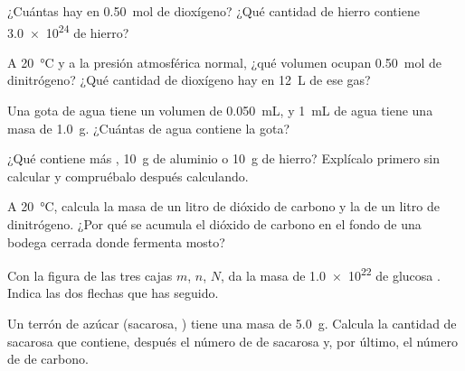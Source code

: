 \begin{exercise}[$\star$]\label{exo:g10:the-mole:4}
¿Cuántas  hay en \qty{0.50}{mol} de dioxígeno? ¿Qué cantidad
de hierro contiene \num{3.0e24}  de hierro?
\end{exercise}

\begin{exercise}[$\star$]\label{exo:g10:the-mole:5}
A \qty{20}{\celsius} y a la presión atmosférica normal, ¿qué volumen
ocupan \qty{0.50}{mol} de dinitrógeno? ¿Qué cantidad de dioxígeno hay en
\qty{12}{L} de ese gas?
\end{exercise}

\begin{exercise}[$\star\star$]\label{exo:g10:the-mole:6}
Una gota de agua tiene un volumen de \qty{0.050}{mL}, y \qty{1}{mL} de
agua tiene una masa de \qty{1.0}{g}. ¿Cuántas  de agua contiene
la gota?
\end{exercise}

\begin{exercise}[$\star\star$]\label{exo:g10:the-mole:7}
¿Qué contiene más , \qty{10}{g} de aluminio o \qty{10}{g} de
hierro? Explícalo primero sin calcular y compruébalo después
calculando.
\end{exercise}

\begin{exercise}[$\star\star$]\label{exo:g10:the-mole:8}
A \qty{20}{\celsius}, calcula la masa de un litro de dióxido de carbono
y la de un litro de dinitrógeno. ¿Por qué se acumula el dióxido de
carbono en el fondo de una bodega cerrada donde fermenta mosto?
\end{exercise}

\begin{exercise}[$\star\star$]\label{exo:g10:the-mole:9}
Con la figura de las tres cajas $m$, $n$, $N$, da la masa de
\num{1.0e22}  de glucosa . Indica las dos flechas
que has seguido.
\end{exercise}

\begin{exercise}[$\star\star$]\label{exo:g10:the-mole:10}
Un terrón de azúcar (sacarosa, ) tiene una masa de
\qty{5.0}{g}. Calcula la cantidad de sacarosa que contiene, después el
número de  de sacarosa y, por último, el número de  de
carbono.
\end{exercise}

